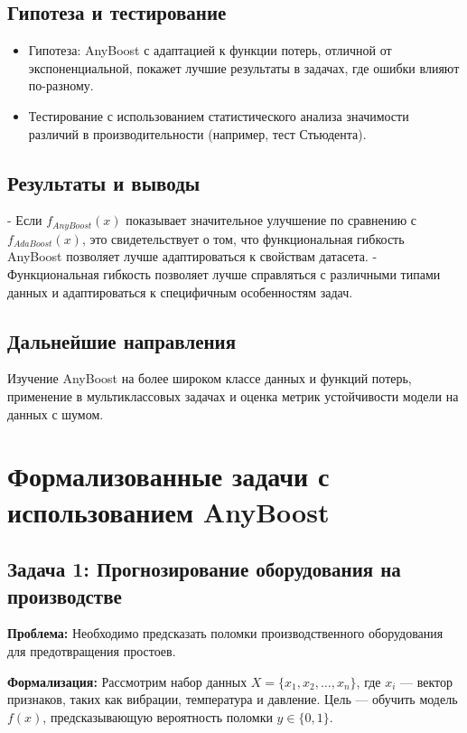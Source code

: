 \subsection*{Гипотеза и тестирование}
\begin{itemize}
    \item Гипотеза: AnyBoost с адаптацией к функции потерь, отличной от экспоненциальной, покажет лучшие результаты в задачах, где ошибки влияют по-разному.
    \item Тестирование с использованием статистического анализа значимости различий в производительности (например, тест Стьюдента).
\end{itemize}

\subsection*{Результаты и выводы}

- Если $f_{AnyBoost}(x)$ показывает значительное улучшение по сравнению с $f_{AdaBoost}(x)$, это свидетельствует о том, что функциональная гибкость AnyBoost позволяет лучше адаптироваться к свойствам датасета.
- Функциональная гибкость позволяет лучше справляться с различными типами данных и адаптироваться к специфичным особенностям задач.

\subsection*{Дальнейшие направления}
Изучение AnyBoost на более широком классе данных и функций потерь, применение в мультиклассовых задачах и оценка метрик устойчивости модели на данных с шумом.


\section*{Формализованные задачи с использованием AnyBoost}

\subsection*{Задача 1: Прогнозирование оборудования на производстве}

\textbf{Проблема:} Необходимо предсказать поломки производственного оборудования для предотвращения простоев.

\textbf{Формализация:} 
Рассмотрим набор данных $X = \{x_1, x_2, \ldots, x_n\}$, где $x_i$ — вектор признаков, таких как вибрации, температура и давление. Цель — обучить модель $f(x)$, предсказывающую вероятность поломки $y \in \{0, 1\}$.

